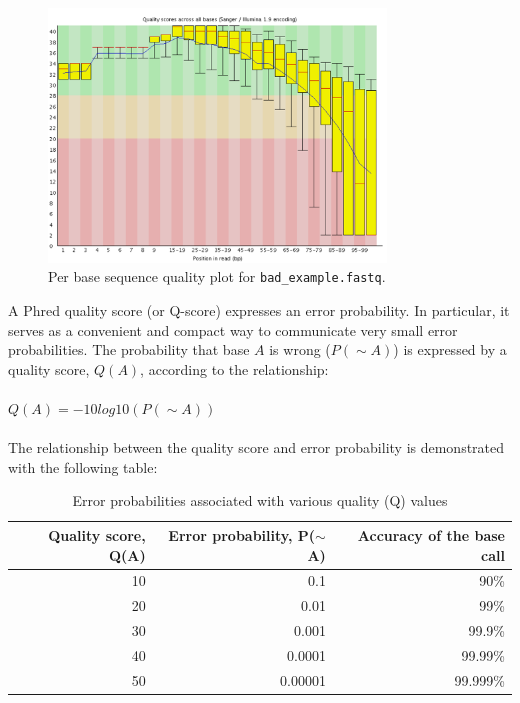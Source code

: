 \begin{figure}[H]
\centering
\includegraphics[width=0.8\textwidth]{ngs-qc/bad_example.png}
\caption{Per base sequence quality plot for \texttt{bad\_example.fastq}.}
\label{fig:bad_example_untrimmed_plot}
\end{figure}

\begin{information}
A Phred quality score (or Q-score) expresses an error probability.  In particular, it
serves as a convenient and compact way to communicate very small error
probabilities.
The probability that base $A$ is wrong ($P(\sim A)$) is expressed
by a quality score, $Q(A)$, according to the relationship:
\\\\
$Q(A) =-10 log10(P(\sim A))$
\\\\
The relationship between the quality score and error probability is demonstrated
with the following table:

\begin{table}[H]
  \centering
  \caption{Error probabilities associated with various quality (Q) values}
    \begin{tabular}{rrr}
    \toprule
    \textbf{Quality score, Q(A)} & \textbf{Error probability, P($\sim$A)} & \textbf{Accuracy of the base call} \\
    \midrule
    10    & 0.1     & 90\% \\
    20    & 0.01    & 99\% \\
    30    & 0.001   & 99.9\% \\
    40    & 0.0001  & 99.99\% \\
    50    & 0.00001 & 99.999\% \\
    \bottomrule
    \end{tabular}
  \label{tab:quality_error_probs}
\end{table}

\end{information}

